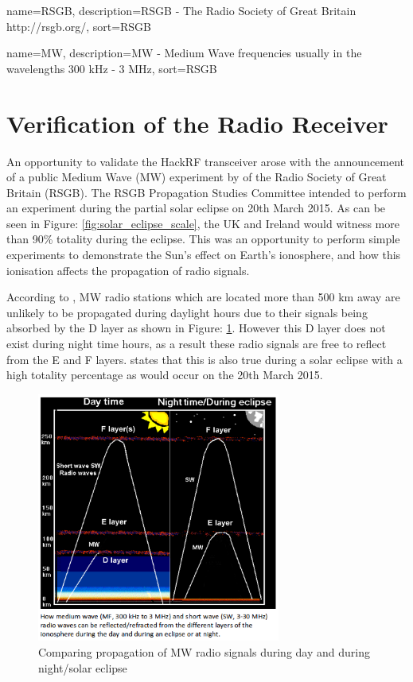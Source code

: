 \documentclass[runningheads,a4paper]{llncs}
\begin{document}
{
  name={RSGB},
  description={RSGB - The Radio Society of Great Britain http://rsgb.org/},
  sort=RSGB
}

{
  name={MW},
  description={MW - Medium Wave frequencies usually in the wavelengths 300 kHz - 3 MHz},
  sort=RSGB
}

\newpage
\section*{Verification of the Radio Receiver}
An opportunity to validate the HackRF transceiver arose with the announcement of a public Medium Wave (\gls{MW}) experiment by \cite{RSGB-15-b} of the Radio Society of Great Britain (\gls{RSGB}). The \gls{RSGB} Propagation Studies Committee intended to perform an experiment during the partial solar eclipse on 20th March 2015. As can be seen in Figure: \ref{fig:solar_eclipse_scale}, the UK and Ireland would witness more than 90\% totality during the eclipse. This was an opportunity to perform simple experiments to demonstrate the Sun's effect on Earth's ionosphere, and how this ionisation affects the propagation of radio signals.

According to \cite{nichols-15-a}, \gls{MW} radio stations which are located more than 500 km away are unlikely to be propagated during daylight hours due to their signals being absorbed by the D layer as shown in Figure: \ref{fig:atmosphere_ionisation_effects_mw}. However this D layer does not exist during night time hours, as a result these radio signals are free to reflect from the E and F layers. \cite{RSGB-15-b} states that this is also true during a solar eclipse with a high totality percentage as would occur on the 20th March 2015.

%
\begin{figure}[!htb]
	\centering
	\includegraphics[width=8cm]{images/53}
	\caption{Comparing propagation of \gls{MW} radio signals during day and during night/solar eclipse \citep{RSGB-15-b}}
	\label{fig:atmosphere_ionisation_effects_mw}
\end{figure}
%
\end{document}
